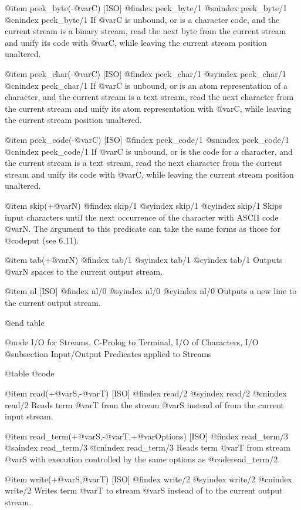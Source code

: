 {{{{{{@item peek_byte(-@var{C}) [ISO]
@findex peek_byte/1
@snindex peek_byte/1
@cnindex peek_byte/1
If @var{C} is unbound, or is a character code, and the current stream is a
binary stream, read the next byte from the current stream and unify its
code with @var{C}, while leaving the current stream position unaltered.

@item peek_char(-@var{C}) [ISO]
@findex peek_char/1
@syindex peek_char/1
@cnindex peek_char/1
If @var{C} is unbound, or is an atom representation of a character, and
the current stream is a text stream, read the next character from the
current stream and unify its atom representation with @var{C}, while
leaving the current stream position unaltered.

@item peek_code(-@var{C}) [ISO]
@findex peek_code/1
@snindex peek_code/1
@cnindex peek_code/1
If @var{C} is unbound, or is the code for a character, and
the current stream is a text stream, read the next character from the
current stream and unify its code with @var{C}, while
leaving the current stream position unaltered.

@item skip(+@var{N})
@findex skip/1
@syindex skip/1
@cyindex skip/1
Skips input characters until the next occurrence of the character with
ASCII code @var{N}. The argument to this predicate can take the same forms
as those for @code{put} (see 6.11).

@item tab(+@var{N})
@findex tab/1
@syindex tab/1
@cyindex tab/1
Outputs @var{N} spaces to the current output stream.

@item nl [ISO]
@findex nl/0
@syindex nl/0
@cyindex nl/0
Outputs a new line to the current output stream.

@end table

@node I/O for Streams, C-Prolog to Terminal, I/O of Characters, I/O
@subsection Input/Output Predicates applied to Streams

@table @code

@item read(+@var{S},-@var{T}) [ISO]
@findex read/2
@syindex read/2
@cnindex read/2
Reads term @var{T} from the stream @var{S} instead of from the current input
stream.

@item read_term(+@var{S},-@var{T},+@var{Options}) [ISO]
@findex read_term/3
@saindex read_term/3
@cnindex read_term/3
Reads term @var{T} from stream @var{S} with execution controlled by the
same options as @code{read_term/2}.

@item write(+@var{S},@var{T}) [ISO]
@findex write/2
@syindex write/2
@cnindex write/2
Writes term @var{T} to stream @var{S} instead of to the current output
stream.

}}}}}}
